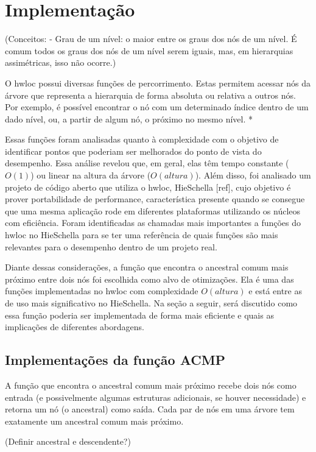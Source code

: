 \chapter{Implementação}

(Conceitos:
- Grau de um nível: o maior entre os graus dos nós de um nível.
É comum todos os graus dos nós de um nível serem iguais, mas, em hierarquias assimétricas, isso não ocorre.)

O hwloc possui diversas funções de percorrimento.
Estas permitem acessar nós da árvore que representa a hierarquia de forma absoluta ou relativa a outros nós.
Por exemplo, é possível encontrar o nó com um determinado índice dentro de um dado nível,
ou, a partir de algum nó, o próximo no mesmo nível.
*

Essas funções foram analisadas quanto à complexidade com o objetivo de identificar pontos que poderiam ser melhorados do ponto de vista do desempenho.
Essa análise revelou que, em geral, elas têm tempo constante ($O(1)$) ou linear na altura da árvore ($O(altura)$).
Além disso, foi analisado um projeto de código aberto que utiliza o hwloc, HieSchella [ref],
cujo objetivo é prover portabilidade de performance, característica presente quando se consegue que
uma mesma aplicação rode em diferentes plataformas utilizando os núcleos com eficiência.
Foram identificadas as chamadas mais importantes a funções do hwloc no HieSchella para se ter uma referência
de quais funções são mais relevantes para o desempenho dentro de um projeto real.

Diante dessas considerações, a função que encontra o ancestral comum mais próximo entre dois nós foi escolhida como alvo de otimizações.
Ela é uma das funções implementadas no hwloc com complexidade $O(altura)$ e está entre as de uso mais significativo no HieSchella.
Na seção a seguir, será discutido como essa função poderia ser implementada de forma mais eficiente e quais as implicações de diferentes abordagens.


\section{Implementações da função ACMP}

A função que encontra o ancestral comum mais próximo recebe dois nós como entrada (e possivelmente algumas estruturas adicionais, se houver necessidade)
e retorna um nó (o ancestral) como saída.
Cada par de nós em uma árvore tem exatamente um ancestral comum mais próximo.

(Definir ancestral e descendente?)

